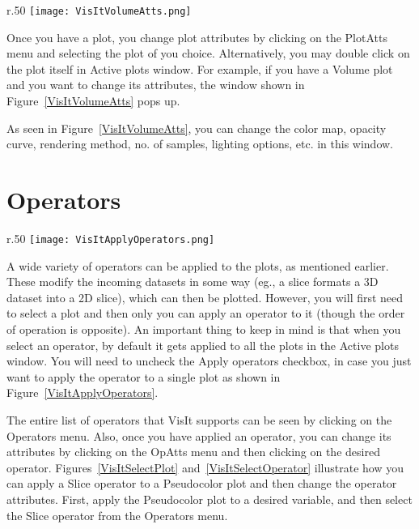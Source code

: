 \begin{wrapfigure}{r}{.50\textwidth}
  \vspace{-20pt}
  \center
  \texttt{[image: VisItVolumeAtts.png]}
  \vspace{-10pt}
  \caption{Volume plot attributes in VisIt}
  \vspace{-40pt}
  \label{VisItVolumeAtts}
\end{wrapfigure}


Once you have a plot, you change plot attributes by clicking on the
PlotAtts menu and selecting the plot of you choice. Alternatively, you
may double click on the plot itself in Active plots window. For
example, if you have a Volume plot and you want to change its
attributes, the window shown in Figure~\ref{VisItVolumeAtts} pops up.



As seen in Figure~\ref{VisItVolumeAtts}, you can change the color map,
opacity curve, rendering method, no. of samples, lighting options,
etc. in this window.



\section{Operators}

\begin{wrapfigure}{r}{.50\textwidth}
  \vspace{-20pt}
  \center
  \texttt{[image: VisItApplyOperators.png]}
  \vspace{-10pt}
  \caption{Unchecking "selection to all plots"}
  \vspace{-10pt}
  \label{VisItApplyOperators}
\end{wrapfigure}


A wide variety of operators can be applied to the plots, as mentioned
earlier. These modify the incoming datasets in some way (eg., a slice
formats a 3D dataset into a 2D slice), which can then be
plotted. However, you will first need to select a plot and then only
you can apply an operator to it (though the order of operation is
opposite). An important thing to keep in mind is that when you select
an operator, by default it gets applied to all the plots in the Active
plots window. You will need to uncheck the Apply operators checkbox,
in case you just want to apply the operator to a single plot as shown
in Figure~\ref{VisItApplyOperators}.


The entire list of operators that VisIt supports can be seen by
clicking on the Operators menu. Also, once you have applied an
operator, you can change its attributes by clicking on the OpAtts menu
and then clicking on the desired operator.
Figures~\ref{VisItSelectPlot} and~\ref{VisItSelectOperator} illustrate
how you can apply a Slice operator to a Pseudocolor plot and then
change the operator attributes.  First, apply the Pseudocolor plot to
a desired variable, and then select the Slice operator from the
Operators menu.

